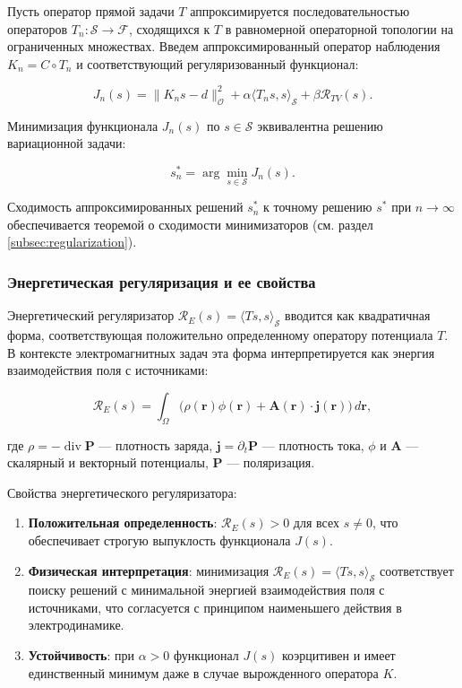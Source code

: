 \documentclass[a4paper,14pt,oneside,openany]{extarticle}
\begin{document}
Пусть оператор прямой задачи $T$ аппроксимируется последовательностью операторов 
$T_n: \mathcal{S} \to \mathcal{F}$, сходящихся к $T$ в равномерной операторной топологии на ограниченных множествах. 
Введем аппроксимированный оператор наблюдения $K_n = C \circ T_n$ и соответствующий регуляризованный функционал:

\begin{equation}
    J_n(s) = \|K_n s - d\|_{\mathcal{O}}^2 + \alpha \langle T_n s, s \rangle_{\mathcal{S}} + \beta \mathcal{R}_{TV}(s).
\end{equation}

Минимизация функционала $J_n(s)$ по $s \in \mathcal{S}$ эквивалентна решению вариационной задачи:

\begin{equation}
    s_n^* = \arg\min_{s \in \mathcal{S}} J_n(s).
\end{equation}

Сходимость аппроксимированных решений $s_n^*$ к точному решению $s^*$ при $n \to \infty$ 
обеспечивается теоремой о сходимости минимизаторов (см. раздел \ref{subsec:regularization}).

\subsubsection{Энергетическая регуляризация и ее свойства}

Энергетический регуляризатор $\mathcal{R}_E(s) = \langle Ts, s \rangle_{\mathcal{S}}$ 
вводится как квадратичная форма, соответствующая положительно определенному оператору потенциала $T$. 
В контексте электромагнитных задач эта форма интерпретируется как энергия взаимодействия поля с источниками:

\begin{equation}
    \mathcal{R}_E(s) = \int_{\Omega} \bigl(\rho(\mathbf{r}) \phi(\mathbf{r}) + 
    \mathbf{A}(\mathbf{r}) \cdot \mathbf{j}(\mathbf{r})\bigr) \, d\mathbf{r},
\end{equation}

где $\rho = -\operatorname{div} \mathbf{P}$ --- плотность заряда, $\mathbf{j} = \partial_t \mathbf{P}$ --- плотность тока, 
$\phi$ и $\mathbf{A}$ --- скалярный и векторный потенциалы, $\mathbf{P}$ --- поляризация.

Свойства энергетического регуляризатора:
\begin{enumerate}
    \item \textbf{Положительная определенность}: $\mathcal{R}_E(s) > 0$ для всех $s \neq 0$, 
    что обеспечивает строгую выпуклость функционала $J(s)$.
    \item \textbf{Физическая интерпретация}: минимизация $\mathcal{R}_E(s) = \langle Ts, s 
    \rangle_{\mathcal{S}}$ соответствует поиску решений с минимальной энергией взаимодействия поля 
    с источниками, что согласуется с принципом наименьшего действия в электродинамике.
    \item \textbf{Устойчивость}: при $\alpha > 0$ функционал $J(s)$ коэрцитивен и имеет 
    единственный минимум даже в случае вырожденного оператора $K$.
\end{enumerate}
\end{document}
